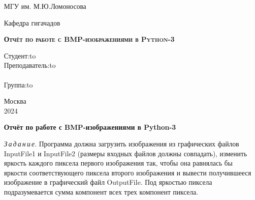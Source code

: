\documentclass{article}
\begin{document}
\begin{titlepage}
\newpage

\begin{center}
МГУ им. М.Ю.Ломоносова \\
\end{center}

\vspace{8em}

\begin{center}
\Large Кафедра гигачадов \\ 
\end{center}

\vspace{2em}

\begin{center}
\textsc{\textbf{Отчёт по работе с BMP-изображениями в Python-3 \linebreak}}
\end{center}

\vspace{15em}



\newbox{\lbox}
\newlength{\maxl}
\setlength{\maxl}{\wd\lbox}
\hfill\parbox{12cm}{
\hspace*{8cm}\hspace*{-5cm}Студент:\hfill\hbox to\\
\hspace*{8cm}\hspace*{-5cm}Преподаватель:\hfill\hbox to\\
\\
\hspace*{8cm}\hspace*{-5cm}Группа:\hfill\hbox to\\
}


\vspace{\fill}

\begin{center}
Москва \\2024
\end{center}

\end{titlepage}

\begin{center}


{\large\bf Отчёт по работе с BMP-изображениями в Python-3}
\end{center}
\textit{З\,а\,д\,а\,н\,и\,е.} Программа должна загрузить изображения из графических файлов
InputFile1 и InputFile2 (размеры входных файлов должны совпадать),
изменить яркость каждого пиксела первого изображения так, чтобы она
равнялась бы яркости соответствующего пиксела второго изображения
и вывести получившееся изображение в графический файл OutputFile.
Под яркостью пиксела подразумевается сумма компонент всех трех компонент пиксела.
\end{document}
